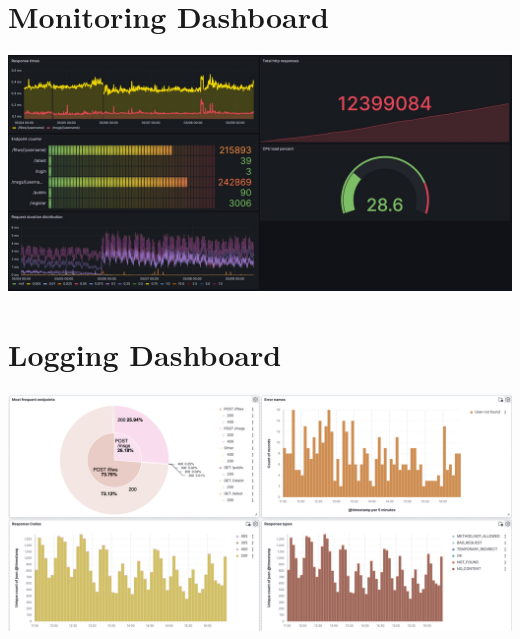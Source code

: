 \section{Monitoring Dashboard}
\label{appendix:monitoringDashboard}
\includegraphics[width=1\textwidth]{images/MonitoringDashboard.jpg}

\section{Logging Dashboard}
\label{appendix:loggingDashboard}
\includegraphics[width=1\textwidth]{images/LoggingDashboard.png}
